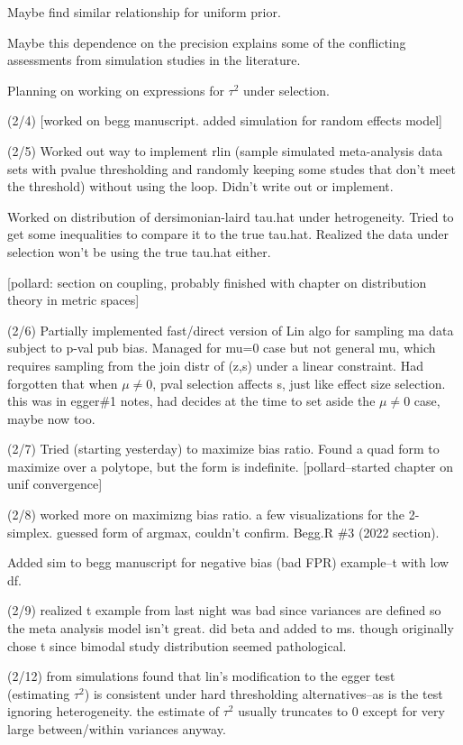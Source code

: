 \documentclass{article}
\begin{document}
Maybe find similar relationship for uniform prior.

Maybe this dependence on the precision explains some of the
conflicting assessments from simulation studies in the literature.

Planning on working on expressions for $\tau^2$ under selection.


(2/4) [worked on begg manuscript. added simulation for random effects model]

(2/5) Worked out way to implement rlin (sample simulated meta-analysis
data sets with pvalue thresholding and randomly keeping some studes
that don't meet the threshold) without using the loop. Didn't write out or implement.

Worked on distribution of dersimonian-laird tau.hat under
hetrogeneity. Tried to get some inequalities to compare it to the true
tau.hat. Realized the data under selection won't be using the true
tau.hat either.

[pollard: section on coupling, probably finished with chapter on
distribution theory in metric spaces]

(2/6) Partially implemented fast/direct version of Lin algo for sampling
ma data subject to p-val pub bias. Managed for mu=0 case but not
general mu, which requires sampling from the join distr of (z,s) under
a linear constraint. Had forgotten that when $\mu\neq 0$, pval selection
affects s, just like effect size selection. this was in egger\#1 notes,
had decides at the time to set aside the $\mu\neq 0$ case, maybe now
too.


(2/7) Tried (starting yesterday) to maximize bias ratio. Found a quad
form to maximize over a polytope, but the form is indefinite. [pollard--started chapter on unif convergence]


(2/8) worked more on maximizng bias ratio. a few visualizations for
the 2-simplex. guessed form of argmax, couldn't confirm. Begg.R \#3
(2022 section).

Added sim to begg manuscript for negative bias (bad FPR) example--t with low df. 

(2/9) realized t example from last night was bad since variances are
defined so the meta analysis model isn't great. did beta and added to
ms. though originally chose t since bimodal study distribution seemed
pathological.


(2/12) from simulations found that lin's modification to the egger
test (estimating $\tau^2$) is consistent under hard thresholding
alternatives--as is the test ignoring heterogeneity. the estimate of
$\tau^2$ usually truncates to 0 except for very large between/within
variances anyway.
\end{document}
